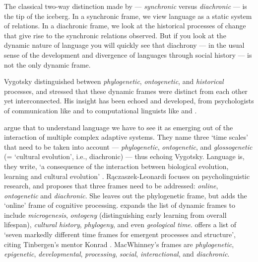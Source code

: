 The classical two-way distinction made by \citet{saussure_cours_1916} --- \textit{synchronic} versus \textit{diachronic} --- is the tip of the iceberg. In a synchronic frame, we view language as a static 
system of relations. In a diachronic frame, we look at the historical processes of change that give rise to the synchronic relations observed. But if you look at the dynamic nature of language you will quickly see that 
diachrony --- in the usual sense of the development and 
divergence of languages through social history --- is not the only dynamic frame. 



Vygotsky distinguished between \textit{phylogenetic}, \textit{ontogenetic}, and \textit{historical} processes, and stressed that 
these dynamic frames were distinct from each other yet interconnected. 
His insight has been echoed and developed, from 
psychologists of communication like \citet{tomasello_cultural_1999} and \citet{cole_phylogeny_2007} to computational linguists like \citet{steels_synthesizing_1998,steels_evolving_2003} and \citet{smith_complex_2003}. 



\citet[540]{smith_complex_2003} argue that to understand language we have to see it 
as emerging out of the interaction of multiple complex adaptive systems. They name three \textquoteleft time scales' that need to be taken into account --- \textit{phylogenetic}, \textit{ontogenetic}, and \textit{glossogenetic} 
(= \textquoteleft cultural evolution', i.e., diachronic) --- thus echoing 
Vygotsky. Language is, they write, \textquoteleft a consequence of the interaction 
between biological evolution, learning and cultural evolution' \citep[541]{smith_complex_2003}. R\k{a}czaszek-Leonardi focuses on psycholinguistic research, and proposes that three frames need to be addressed: \textit{online}, \textit{ontogenetic} and \textit{diachronic}. She leaves out the phylogenetic frame, but adds the \textquoteleft online' frame 
of cognitive processing. \citet[185]{cole_cultural_1996} expands the list of dynamic frames to include \textit{microgenesis}, \textit{ontogeny} (distinguishing early learning from 
overall lifespan), \textit{cultural history}, \textit{phylogeny}, 
and even \textit{geological time}. \citet[193--195]{macwhinney_emergence_2005} offers a list of \textquoteleft seven markedly different 
time frames for emergent processes and structure', citing Tinbergen's 
mentor Konrad \citet{lorenz_evolution_1958}. MacWhinney's frames are \textit{phylogenetic}, \textit{epigenetic}, \textit{developmental}, 
\textit{processing}, \textit{social}, \textit{interactional}, 
and \textit{diachronic}. 



